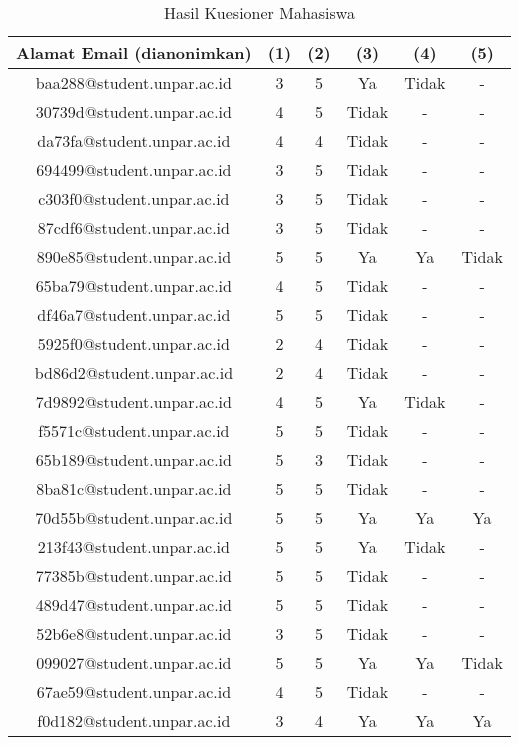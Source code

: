 \begin{longtable}{|c|c|c|c|c|c|}
	\caption{Hasil Kuesioner Mahasiswa} 
	\label{table:hasil-kuesioner-mahasiswa} \\
\hline
\textbf{Alamat Email (dianonimkan)} & \textbf{(1)} & \textbf{(2)} & \textbf{(3)}  & \textbf{(4)} & \textbf{(5)} \\
\hline	baa288@student.unpar.ac.id	&	3	&	5	&	Ya	&	Tidak	&	-	\\
\hline	30739d@student.unpar.ac.id	&	4	&	5	&	Tidak	&	-	&	-	\\
\hline	da73fa@student.unpar.ac.id	&	4	&	4	&	Tidak	&	-	&	-	\\
\hline	694499@student.unpar.ac.id	&	3	&	5	&	Tidak	&	-	&	-	\\
\hline	c303f0@student.unpar.ac.id	&	3	&	5	&	Tidak	&	-	&	-	\\
\hline	87cdf6@student.unpar.ac.id	&	3	&	5	&	Tidak	&	-	&	-	\\
\hline	890e85@student.unpar.ac.id	&	5	&	5	&	Ya	&	Ya	&	Tidak	\\
\hline	65ba79@student.unpar.ac.id	&	4	&	5	&	Tidak	&	-	&	-	\\
\hline	df46a7@student.unpar.ac.id	&	5	&	5	&	Tidak	&	-	&	-	\\
\hline	5925f0@student.unpar.ac.id	&	2	&	4	&	Tidak	&	-	&	-	\\
\hline	bd86d2@student.unpar.ac.id	&	2	&	4	&	Tidak	&	-	&	-	\\
\hline	7d9892@student.unpar.ac.id	&	4	&	5	&	Ya	&	Tidak	&	-	\\
\hline	f5571c@student.unpar.ac.id	&	5	&	5	&	Tidak	&	-	&	-	\\
\hline	65b189@student.unpar.ac.id	&	5	&	3	&	Tidak	&	-	&	-	\\
\hline	8ba81c@student.unpar.ac.id	&	5	&	5	&	Tidak	&	-	&	-	\\
\hline	70d55b@student.unpar.ac.id	&	5	&	5	&	Ya	&	Ya	&	Ya	\\
\hline	213f43@student.unpar.ac.id	&	5	&	5	&	Ya	&	Tidak	&	-	\\
\hline	77385b@student.unpar.ac.id	&	5	&	5	&	Tidak	&	-	&	-	\\
\hline	489d47@student.unpar.ac.id	&	5	&	5	&	Tidak	&	-	&	-	\\
\hline	52b6e8@student.unpar.ac.id	&	3	&	5	&	Tidak	&	-	&	-	\\
\hline	099027@student.unpar.ac.id	&	5	&	5	&	Ya	&	Ya	&	Tidak	\\
\hline	67ae59@student.unpar.ac.id	&	4	&	5	&	Tidak	&	-	&	-	\\
\hline	f0d182@student.unpar.ac.id	&	3	&	4	&	Ya	&	Ya	&	Ya	\\

\end{longtable}
